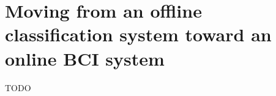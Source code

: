 






\chapter{Moving from an offline classification system toward an online BCI system}
\label{ch:online_bci_system}
TODO

